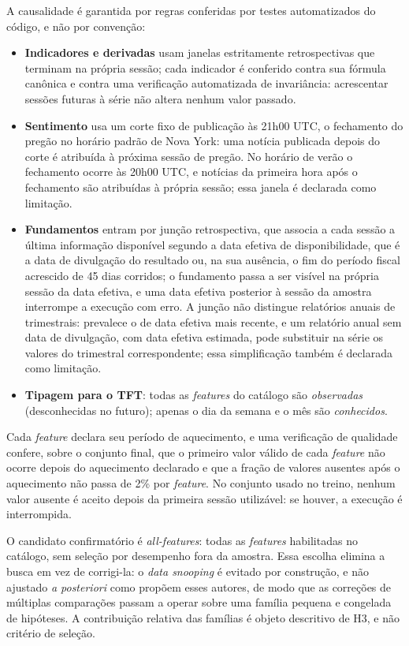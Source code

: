 A causalidade é garantida por regras conferidas por testes automatizados do código, e não por convenção:
\begin{itemize}
    \item \textbf{Indicadores e derivadas} usam janelas estritamente retrospectivas que terminam na própria sessão; cada indicador é conferido contra sua fórmula canônica e contra uma verificação automatizada de invariância: acrescentar sessões futuras à série não altera nenhum valor passado.
    \item \textbf{Sentimento} usa um corte fixo de publicação às 21h00 UTC, o fechamento do pregão no horário padrão de Nova York: uma notícia publicada depois do corte é atribuída à próxima sessão de pregão. No horário de verão o fechamento ocorre às 20h00 UTC, e notícias da primeira hora após o fechamento são atribuídas à própria sessão; essa janela é declarada como limitação.
    \item \textbf{Fundamentos} entram por junção retrospectiva, que associa a cada sessão a última informação disponível segundo a data efetiva de disponibilidade, que é a data de divulgação do resultado ou, na sua ausência, o fim do período fiscal acrescido de 45 dias corridos; o fundamento passa a ser visível na própria sessão da data efetiva, e uma data efetiva posterior à sessão da amostra interrompe a execução com erro. A junção não distingue relatórios anuais de trimestrais: prevalece o de data efetiva mais recente, e um relatório anual sem data de divulgação, com data efetiva estimada, pode substituir na série os valores do trimestral correspondente; essa simplificação também é declarada como limitação.
    \item \textbf{Tipagem para o TFT}: todas as \textit{features} do catálogo são \textit{observadas} (desconhecidas no futuro); apenas o dia da semana e o mês são \textit{conhecidos}.
\end{itemize}

Cada \textit{feature} declara seu período de aquecimento, e uma verificação de qualidade confere, sobre o conjunto final, que o primeiro valor válido de cada \textit{feature} não ocorre depois do aquecimento declarado e que a fração de valores ausentes após o aquecimento não passa de 2\% por \textit{feature}. No conjunto usado no treino, nenhum valor ausente é aceito depois da primeira sessão utilizável: se houver, a execução é interrompida.

O candidato confirmatório é \textit{all-features}: todas as \textit{features} habilitadas no catálogo, sem seleção por desempenho fora da amostra. Essa escolha elimina a busca em vez de corrigi-la: o \textit{data snooping} \cite{WHITE2000,ROMANOWOLF2005} é evitado por construção, e não ajustado \textit{a posteriori} como propõem esses autores, de modo que as correções de múltiplas comparações passam a operar sobre uma família pequena e congelada de hipóteses. A contribuição relativa das famílias é objeto descritivo de H3, e não critério de seleção.

